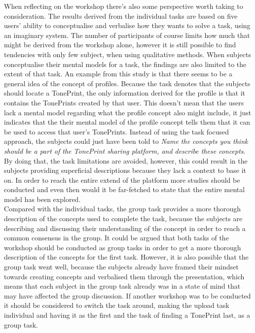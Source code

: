 \noindent
When reflecting on the workshop there's also some perspective worth taking to consideration. The results derived from the individual tasks are based on five users' ability to conceptualise and verbalise how they wants to solve a task, using an imaginary system. The number of participants of course limits how much that might be derived from the workshop alone, however it is still possible to find tendencies with only few subject, when using qualitative methods. When subjects conceptualise their mental models for a task, the findings are also limited to the extent of that task. An example from this study is that there seems to be a general idea of the concept of profiles. Because the task denotes that the subjects should locate a TonePrint, the only information derived for the profile is that it contains the TonePrints created by that user. This doesn't mean that the users lack a mental model regarding what the profile concept also might include, it just indicates that the their mental model of the profile concept tells them that it can be used to access that user's TonePrints. Instead of using the task focused approach, the subjects could just have been told to \textit{Name the concepts you think should be a part of the TonePrint sharing platform, and describe these concepts}. By doing that, the task limitations are avoided, however, this could result in the subjects providing superficial descriptions because they lack a context to base it on. In order to reach the entire extend of the platform more studies should be conducted and even then would it be far-fetched to state that the entire mental model has been explored. \\

\noindent
Compared with the individual tasks, the group task provides a more thorough description of the concepts used to complete the task, because the subjects are describing and discussing their understanding of the concept in order to reach a common consensus in the group. It could be argued that both tasks of the workshop should be conducted as group tasks in order to get a more thorough description of the concepts for the first task. However, it is also possible that the group task went well, because the subjects already have framed their mindset towards creating concepts and verbalised them through the presentation, which means that each subject in the group task already was in a state of mind that may have affected the group discussion. If another workshop was to be conducted it should be considered to switch the task around, making the upload task individual and having it as the first and the task of finding a TonePrint last, as a group task.\\


